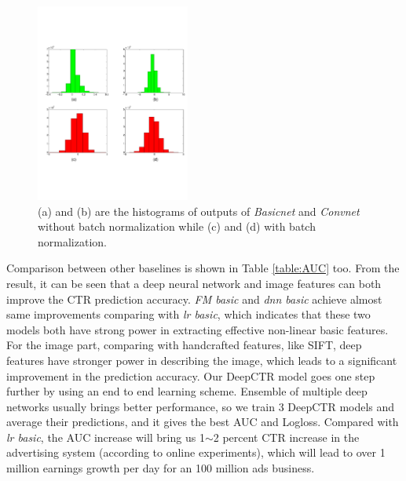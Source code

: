 \documentclass{sig-alternate-05-2015}
\begin{document}
\begin{figure}
	\centering
	\includegraphics[width=0.45\textwidth]{bn_hist_embed}
	\caption{(a) and (b) are the histograms of outputs of \emph{Basicnet} and \emph{Convnet} without batch normalization while (c) and (d) with batch normalization. }
	\label{fig:bn_comb}
\end{figure}

Comparison between other baselines is shown in Table \ref{table:AUC} too. From the result, it can be seen that a deep neural network and image features can both improve the CTR prediction accuracy.  \emph{FM basic} and \emph{dnn basic} achieve almost same improvements comparing with \emph{lr basic}, which  indicates that these two models both have strong  power in extracting effective non-linear basic features.   For the image part, comparing with handcrafted features, like SIFT, deep features have stronger power in describing the image, which leads to a significant improvement in the prediction accuracy. Our DeepCTR model goes one step further by using an end to end learning scheme. Ensemble of multiple deep networks usually brings better performance, so we train 3 DeepCTR models and average their predictions, and it gives the best AUC and Logloss. Compared with \emph{lr basic}, the AUC increase will bring us 1$\sim$2 percent CTR increase in the advertising system (according to online experiments), which will lead to over 1 million earnings growth per day for an 100 million ads business.  
\end{document}
